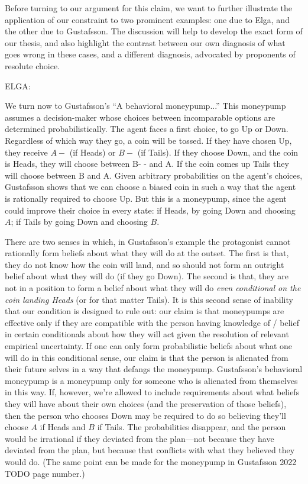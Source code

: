 \documentclass[11pt]{article}
\theoremstyle{definition}
\theoremstyle{definition}
\begin{document}
Before turning to our argument for this claim, we want to further illustrate the application of our constraint to two prominent examples: one due to Elga, and the other due to Gustafsson. The discussion will help to develop the exact form of our thesis, and also highlight the contrast between our own diagnosis of what goes wrong in these cases, and a different diagnosis, advocated by proponents of resolute choice.

ELGA:

We turn now to Gustafsson's ``A behavioral moneypump...'' This moneypump assumes a decision-maker whose choices between incomparable options are determined probabilistically. The agent faces a first choice, to go Up or Down. Regardless of which way they go, a coin will be tossed. If they have chosen Up,  they receive $A-$ (if Heads) or $B-$ (if Tails). If they choose Down, and the coin is Heads, they will choose between B- - and A. If the coin comes up Tails they will choose between B and A. Given arbitrary probabilities on the agent's choices, Gustafsson shows that we can choose a biased coin in such a way that the agent is rationally required to choose Up. But this is a moneypump, since the agent could improve their choice in every state: if Heads, by going Down and choosing $A$; if Tails by going Down and choosing $B$. 

There are two senses in which, in Gustafsson's example the protagonist cannot rationally form beliefs about what they will do at the outset. The first is that, they do not know how the coin will land, and so should not form an outright belief about what they will do (if they go Down). The second is that, they are not in a position to form a belief about what they will do \emph{even conditional on the coin landing Heads} (or for that matter Tails). It is this second sense of inability that our condition is designed to rule out: our claim is that moneypumps are effective only if they are compatible with the person having knowledge of / belief in certain conditionals about how they will act given the resolution of relevant empirical uncertainty. If one can only form probabilistic beliefs about what one will do in this conditional sense, our claim is that the person is alienated from their future selves in a way that defangs the moneypump.  Gustafsson's behavioral moneypump is a moneypump only for someone who is alienated from themselves in this way. If, however, we're allowed to include requirements about what beliefs they will have about their own choices (and the preservation of those beliefs), then the person who chooses Down may be required to do so believing they'll choose $A$ if Heads and $B$ if Tails. The probabilities disappear, and the person would be irrational if they deviated from the plan---not because they have deviated from the plan, but because that conflicts with what they believed they would do. (The same point can be made for the moneypump in Gustafsson 2022 TODO page number.)
\end{document}
